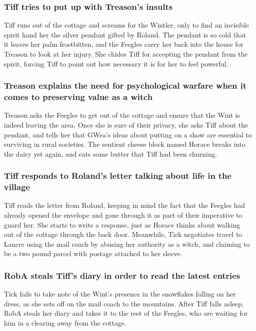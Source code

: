 \subsubsection{\Gls{Tiff} tries to put up with \Gls{Treason}'s insults}
\Gls{Tiff} runs out of the cottage and screams for the \Gls{Wintler}, only to find an invisible
spirit hand her the silver pendant gifted by \Gls{Roland}. The pendant is so cold that it leaves her
palm frostbitten, and the Feegles carry her back into the house for \Gls{Treason} to look at her
injury. She chides \Gls{Tiff} for accepting the pendant from the spirit, forcing \Gls{Tiff} to
point out how necessary it is for her to feel powerful.

\subsubsection{\Gls{Treason} explains the need for psychological warfare when it comes to preserving
    value as a witch}
\Gls{Treason} asks the Feegles to get out of the cottage and ensure that the \Gls{Wint} is indeed
leaving the area. Once she is sure of their privacy, she asks \Gls{Tiff} about the pendant, and
tells her that \Gls{GWea}'s ideas about putting on a show are essential to surviving in rural
societies. The sentient cheese block named \Gls{Horace} breaks into the dairy yet again, and eats
some butter that \Gls{Tiff} had been churning.

\subsubsection{\Gls{Tiff} responds to \Gls{Roland}'s letter talking about life in the village}
\Gls{Tiff} reads the letter from \Gls{Roland}, keeping in mind the fact that the Feegles had already
opened the envelope and gone through it as part of their imperative to guard her. She starts to
write a response, just as \Gls{Horace} thinks about walking out of the cottage through the back
door. Meanwhile, \Gls{Tick} negotiates travel to Lancre using the mail coach by abusing her
authority as a witch, and claiming to be a two pound parcel with postage attached to her sleeve.

\subsubsection{\Gls{RobA} steals \Gls{Tiff}'s diary in order to read the latest entries}
\Gls{Tick} fails to take note of the \Gls{Wint}'s presence in the snowflakes falling on her dress,
as she sets off on the mail coach to the mountains. After \Gls{Tiff} falls asleep, \Gls{RobA} steals
her diary and takes it to the rest of the Feegles, who are waiting for him in a clearing away from
the cottage.

